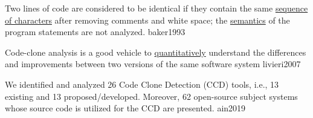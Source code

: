 \documentclass{article}
\begin{document}

  {Two lines of code are considered to be identical if they contain the same \ul{sequence of characters} after removing comments and white space; the \ul{semantics} of the program statements are not analyzed.}
  {baker1993}

  {Code-clone analysis is a good vehicle to \ul{quantitatively} understand the differences and improvements between two versions of the same software system}
  {livieri2007}

  {We identified and analyzed 26 Code Clone Detection (CCD) tools, i.e., 13 existing and 13 proposed/developed. Moreover, 62 open-source subject systems whose source code is utilized for the CCD are presented.}
  {ain2019}
\end{document}
